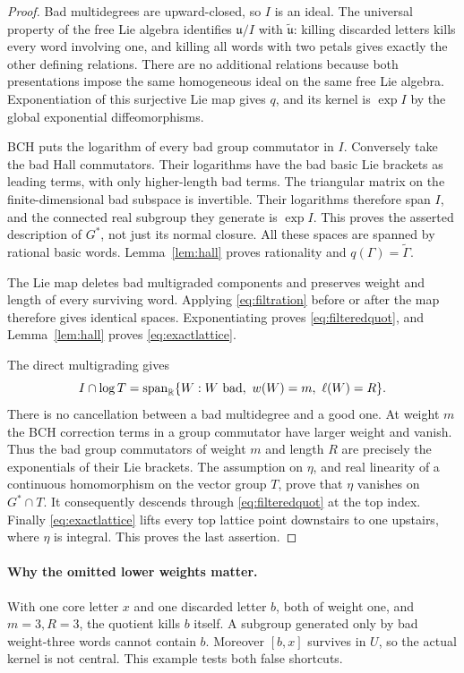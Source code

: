 \documentclass[11pt]{article}
\newcommand{\R}{\mathbb R}\newcommand{\Q}{\mathbb Q}
\newcommand{\lie}{\mathfrak u}\newcommand{\id}{\mathrm{id}}
\begin{document}
\begin{proof}
Bad multidegrees are upward-closed, so $I$ is an ideal. The universal property
of the free Lie algebra identifies $\lie/I$ with $\widetilde{\lie}$:
killing discarded letters kills every word involving one, and killing
all words with two petals gives exactly the other defining relations.
There are no additional relations because both presentations impose the
same homogeneous ideal on the same free Lie algebra. Exponentiation of this
surjective Lie map gives $q$, and its kernel is $\exp I$ by the global
exponential diffeomorphisms.

BCH puts the logarithm of every bad group commutator in $I$. Conversely
take the bad Hall commutators. Their logarithms have the bad basic Lie
brackets as leading terms, with only higher-length bad terms. The triangular
matrix on the finite-dimensional bad subspace is invertible. Their logarithms
therefore span $I$, and the connected real subgroup they generate is $\exp I$.
This proves the asserted description of $G^*$, not just its normal closure.
All these spaces are spanned by rational basic words. Lemma~\ref{lem:hall}
proves rationality and $q(\Gamma)=\widetilde\Gamma$.

The Lie map deletes bad multigraded components and preserves weight and
length of every surviving word. Applying \eqref{eq:filtration} before or
after the map therefore gives identical spaces. Exponentiating proves
\eqref{eq:filteredquot}, and Lemma~\ref{lem:hall} proves
\eqref{eq:exactlattice}.

The direct multigrading gives
\[
 I\cap\log T=\operatorname{span}_{\R}
    \{W:W\hbox{ bad},\ w(W)=m,\ \ell(W)=R\}.
\]
There is no cancellation between a bad multidegree and a good one. At
weight $m$ the BCH correction terms in a group commutator have larger
weight and vanish. Thus the bad group commutators of weight $m$ and
length $R$ are precisely the exponentials of their Lie brackets.
The assumption on $\eta$, and real linearity of a continuous homomorphism
on the vector group $T$, prove that $\eta$ vanishes on $G^*\cap T$.
It consequently descends through \eqref{eq:filteredquot} at the top index.
Finally \eqref{eq:exactlattice} lifts every top lattice point downstairs to
one upstairs, where $\eta$ is integral. This proves the last assertion.
\end{proof}

\paragraph{Why the omitted lower weights matter.}
With one core letter $x$ and one discarded letter $b$, both of weight one,
and $m=3,R=3$, the quotient kills $b$ itself. A subgroup generated only by
bad weight-three words cannot contain $b$. Moreover $[b,x]$ survives in $U$,
so the actual kernel is not central. This example tests both false shortcuts.
\end{document}
